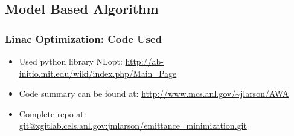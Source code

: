 \documentclass[professionalfonts,t]{beamer}
\begin{document}
\subsection{Model Based Algorithm}
\begin{frame}
\frametitle{Linac Optimization: Code Used}
\begin{itemize}
	\setlength\itemsep{2em}
	\item Used python library NLopt: \url{http://ab-initio.mit.edu/wiki/index.php/Main_Page}
	
	\item Code summary can be found at: \url{http://www.mcs.anl.gov/~jlarson/AWA}
	
	\item Complete repo at: \url{git@xgitlab.cels.anl.gov:jmlarson/emittance_minimization.git}
\end{itemize}	
\end{frame}
\end{document}

